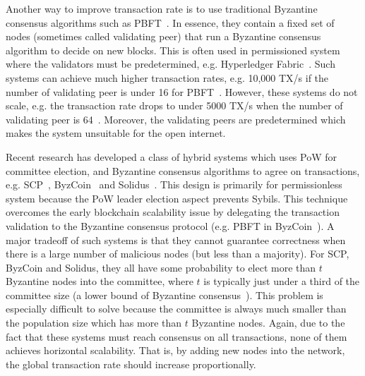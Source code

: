 Another way to improve transaction rate is to use traditional Byzantine consensus algorithms such as PBFT~\cite{castro1999practical}.
In essence, they contain a fixed set of nodes (sometimes called validating peer) that run a Byzantine consensus algorithm to decide on new blocks.
This is often used in permissioned system where the validators must be predetermined, e.g. Hyperledger Fabric~\cite{cachin2016architecture}.
Such systems can achieve much higher transaction rates, e.g. 10,000 TX/s if the number of validating peer is under 16 for PBFT~\cite[Section 5.2]{miller2016honey}.
However, these systems do not scale, e.g. the transaction rate drops to under 5000 TX/s when the number of validating peer is 64~\cite[Section 5.2]{miller2016honey}.
Moreover, the validating peers are predetermined which makes the system unsuitable for the open internet.

Recent research has developed a class of hybrid systems which uses PoW for committee election,
and Byzantine consensus algorithms to agree on transactions, e.g. SCP~\cite{luu2015scp}, ByzCoin~\cite{kogias2016enhancing} and Solidus~\cite{abraham2016solidus}.
This design is primarily for permissionless system because the PoW leader election aspect prevents Sybils.
This technique overcomes the early blockchain scalability issue by delegating the transaction validation to the Byzantine consensus protocol (e.g. PBFT in ByzCoin~\cite{kogias2016enhancing}).
A major tradeoff of such systems is that they cannot guarantee correctness when there is a large number of malicious nodes (but less than a majority).
For SCP, ByzCoin and Solidus, they all have some probability to elect more than $t$ Byzantine nodes into the committee,
where $t$ is typically just under a third of the committee size (a lower bound of Byzantine consensus~\cite{pease1980reaching}).
This problem is especially difficult to solve because the committee is always much smaller than the population size which has more than $t$ Byzantine nodes.
Again, due to the fact that these systems must reach consensus on all transactions,
none of them achieves horizontal scalability.
That is, by adding new nodes into the network, the global transaction rate should increase proportionally.

